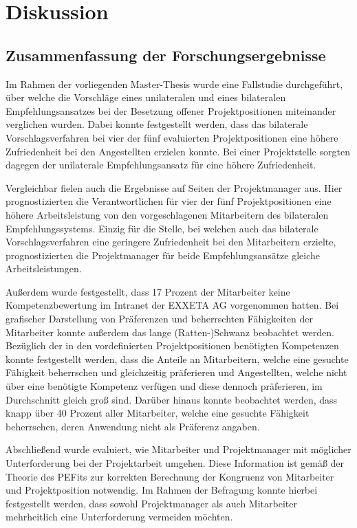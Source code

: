 \chapter{Diskussion}
\label{ch:diskussion}

\section{Zusammenfassung der Forschungsergebnisse}
\label{ch:diskussion:zusammenfassung}
Im Rahmen der vorliegenden Master-Thesis wurde eine Fallstudie durchgeführt, über welche die Vorschläge eines unilateralen und eines bilateralen Empfehlungsansatzes bei der Besetzung offener Projektpositionen miteinander verglichen wurden. Dabei konnte festgestellt werden, dass das bilaterale Vorschlagsverfahren bei vier der fünf evaluierten Projektpositionen eine höhere Zufriedenheit bei den Angestellten erzielen konnte. Bei einer Projektstelle sorgten dagegen der unilaterale Empfehlungsansatz für eine höhere Zufriedenheit.

Vergleichbar fielen auch die Ergebnisse auf Seiten der Projektmanager aus. Hier prognostizierten die Verantwortlichen für vier der fünf Projektpositionen eine höhere Arbeitsleistung von den vorgeschlagenen Mitarbeitern des bilateralen Empfehlungssystems. Einzig für die Stelle, bei welchen auch das bilaterale Vorschlagsverfahren eine geringere Zufriedenheit bei den Mitarbeitern erzielte, prognostizierten die Projektmanager für beide Empfehlungsansätze gleiche Arbeitsleistungen.

Außerdem wurde festgestellt, dass 17 Prozent der Mitarbeiter keine Kompetenzbewertung im Intranet der EXXETA AG vorgenommen hatten. Bei grafischer Darstellung von Präferenzen und beherrschten Fähigkeiten der Mitarbeiter konnte außerdem das lange (Ratten-)Schwanz beobachtet werden. Bezüglich der in den vordefinierten Projektpositionen benötigten Kompetenzen konnte festgestellt werden, dass die Anteile an Mitarbeitern, welche eine gesuchte Fähigkeit beherrschen und gleichzeitig präferieren und Angestellten, welche nicht über eine benötigte Kompetenz verfügen und diese dennoch präferieren, im Durchschnitt gleich groß sind. Darüber hinaus konnte beobachtet werden, dass knapp über 40 Prozent aller Mitarbeiter, welche eine gesuchte Fähigkeit beherrschen, deren Anwendung nicht als Präferenz angaben.

Abschließend wurde evaluiert, wie Mitarbeiter und Projektmanager mit möglicher Unterforderung bei der Projektarbeit umgehen. Diese Information ist gemäß der Theorie des \acp{PEFit} zur korrekten Berechnung der Kongruenz von Mitarbeiter und Projektposition notwendig. Im Rahmen der Befragung konnte hierbei festgestellt werden, dass sowohl Projektmanager als auch Mitarbeiter mehrheitlich eine Unterforderung vermeiden möchten.

